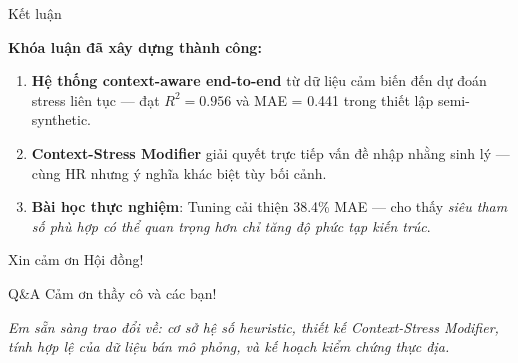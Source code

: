\documentclass[11pt]{beamer}
\begin{document}
\begin{frame}{Kết luận}
\small
\begin{center}
\large\textbf{Khóa luận đã xây dựng thành công:}
\end{center}

\vspace{0.2cm}

\begin{enumerate}
    \item \textbf{Hệ thống context-aware end-to-end} từ dữ liệu cảm biến đến dự đoán stress liên tục --- đạt $R^2 = 0.956$ và MAE = 0.441 trong thiết lập semi-synthetic.

    \vspace{0.1cm}
    \item \textbf{Context-Stress Modifier} giải quyết trực tiếp vấn đề nhập nhằng sinh lý --- cùng HR nhưng ý nghĩa khác biệt tùy bối cảnh.

    \vspace{0.1cm}
    \item \textbf{Bài học thực nghiệm}: Tuning cải thiện 38.4\% MAE --- cho thấy \textit{siêu tham số phù hợp có thể quan trọng hơn chỉ tăng độ phức tạp kiến trúc}.
\end{enumerate}

\vspace{0.2cm}

\vspace{0.25cm}
\centering
\Large Xin cảm ơn Hội đồng!
\end{frame}

\begin{frame}{Q\&A}
\centering
\Huge Cảm ơn thầy cô và các bạn!

\vspace{0.3cm}
\normalsize
\textit{Em sẵn sàng trao đổi về: cơ sở hệ số heuristic, thiết kế Context-Stress Modifier, tính hợp lệ của dữ liệu bán mô phỏng, và kế hoạch kiểm chứng thực địa.}
\end{frame}
\end{document}
